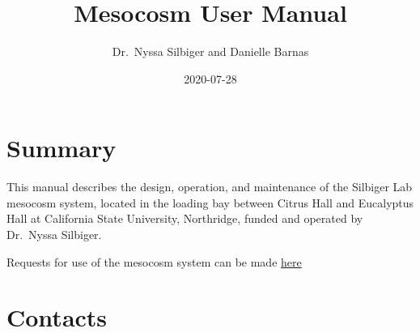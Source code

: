 \documentclass[]{book}
\title{Mesocosm User Manual}
\author{Dr.~Nyssa Silbiger and Danielle Barnas}
\date{2020-07-28}
\begin{document}
\maketitle

{
\setcounter{tocdepth}{1}
\tableofcontents
}
\chapter{Summary}\label{summary}

This manual describes the design, operation, and maintenance of the
Silbiger Lab mesocosm system, located in the loading bay between Citrus
Hall and Eucalyptus Hall at California State University, Northridge,
funded and operated by Dr.~Nyssa Silbiger.

Requests for use of the mesocosm system can be made
\href{https://docs.google.com/forms/d/1LCZG39k8dJmIDLb5l6XBP8-Ow2yxawrKlUB2wUDesqg/edit}{here}

\chapter{Contacts}\label{contacts}
\end{document}
